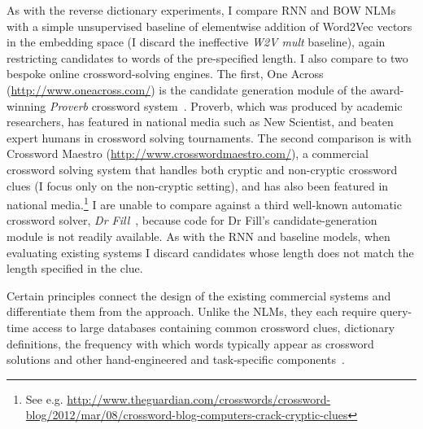As with the reverse dictionary experiments, I compare RNN and BOW NLMs with a
simple unsupervised baseline of elementwise addition of Word2Vec vectors in the
embedding space (I discard the ineffective \emph{W2V mult} baseline), again
restricting candidates to words of the pre-specified length. I also compare to
two bespoke online crossword-solving engines. The first, One Across
(\url{http://www.oneacross.com/}) is the candidate generation module of the
award-winning \emph{Proverb} crossword system~\citep{littman2002probabilistic}.
Proverb, which was produced by academic researchers, has featured in national
media such as New Scientist, and beaten expert humans in crossword solving
tournaments. The second comparison is with Crossword Maestro
(\url{http://www.crosswordmaestro.com/}), a commercial crossword solving system
that handles both cryptic and non-cryptic crossword clues (I focus only on the
non-cryptic setting), and has also been featured in national
media.\footnote{
    See e.g.
    \url{http://www.theguardian.com/crosswords/crossword-blog/2012/mar/08/crossword-blog-computers-crack-cryptic-clues}
}
I are unable to compare against a third well-known automatic crossword solver,
\emph{Dr Fill}~\citep{ginsberg2011dr}, because code for Dr Fill's
candidate-generation module is not readily available. As with the RNN and
baseline models, when evaluating existing systems I discard candidates whose
length does not match the length specified in the clue.  

Certain principles connect the design of the existing commercial systems and differentiate them from the approach. Unlike the NLMs, they each require query-time access to large databases containing common crossword clues, dictionary definitions, the frequency with which words typically appear as crossword solutions and other hand-engineered and task-specific components~\citep{littman2002probabilistic,ginsberg2011dr}. 

